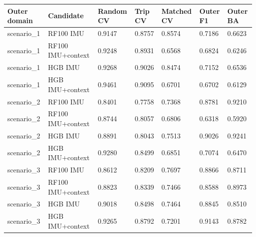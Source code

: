 \begin{singlespace}\small
\noindent\begin{minipage}{\linewidth}
\centering
{}
\begin{tabularx}{\linewidth}{XYYYYYY}
\toprule
Outer domain & Candidate & Random CV & Trip CV & Matched CV & Outer F1 & Outer BA \\
\midrule
scenario\_1 & RF100 IMU & 0.9147 & 0.8757 & 0.8574 & 0.7186 & 0.6623 \\
scenario\_1 & RF100 IMU+context & 0.9248 & 0.8931 & 0.6568 & 0.6824 & 0.6246 \\
scenario\_1 & HGB IMU & 0.9268 & 0.9026 & 0.8474 & 0.7152 & 0.6536 \\
scenario\_1 & HGB IMU+context & 0.9461 & 0.9095 & 0.6701 & 0.6702 & 0.6129 \\
scenario\_2 & RF100 IMU & 0.8401 & 0.7758 & 0.7368 & 0.8781 & 0.9210 \\
scenario\_2 & RF100 IMU+context & 0.8744 & 0.8057 & 0.6806 & 0.6318 & 0.5920 \\
scenario\_2 & HGB IMU & 0.8891 & 0.8043 & 0.7513 & 0.9026 & 0.9241 \\
scenario\_2 & HGB IMU+context & 0.9280 & 0.8499 & 0.6851 & 0.7074 & 0.6470 \\
scenario\_3 & RF100 IMU & 0.8612 & 0.8209 & 0.7697 & 0.8866 & 0.8711 \\
scenario\_3 & RF100 IMU+context & 0.8823 & 0.8339 & 0.7466 & 0.8588 & 0.8973 \\
scenario\_3 & HGB IMU & 0.9018 & 0.8498 & 0.7464 & 0.8845 & 0.8510 \\
scenario\_3 & HGB IMU+context & 0.9265 & 0.8792 & 0.7201 & 0.9143 & 0.8782 \\
\bottomrule
\end{tabularx}
\end{minipage}
\end{singlespace}
\par\medskip
\par\medskip
